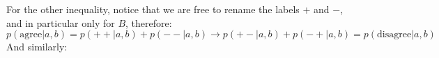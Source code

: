 \documentclass[12pt,a4]{article}
\begin{document}
\begin{enumerate}
\begin{enumerate}
        For the other inequality, notice that we are free to rename the labels $+$ and $-$, and in particular only for $B$, therefore:
        \begin{equation*}
          p(\text{agree}|a , b) = p(++|a,b) + p(--|a,b) \to  p(+-|a,b) + p(-+|a,b) = p(\text{disagree}|a , b)
        \end{equation*}
        And similarly:
        \begin{equation*}

\end{equation*}
\end{enumerate}
\end{enumerate}
\end{document}
